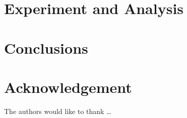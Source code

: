 \section{Experiment and Analysis} \label{sec-experiment}




\section{Conclusions} \label{sec-conclusions}

\blindtext

\section*{Acknowledgement}

\lipsum[1]


The authors would like to thank \ldots

